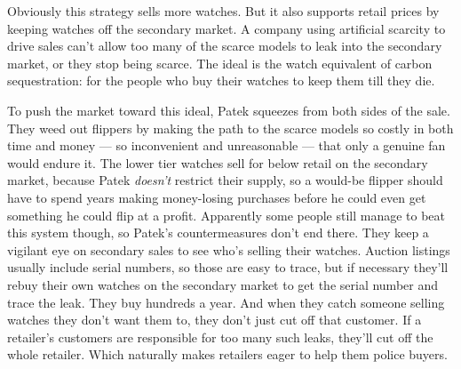 \documentclass[12pt]{book}
\begin{document}
Obviously this strategy sells more watches. But it also supports retail
prices by keeping watches off the secondary market. A company using
artificial scarcity to drive sales can't allow too many of the scarce
models to leak into the secondary market, or they stop being scarce. The
ideal is the watch equivalent of carbon sequestration: for the people
who buy their watches to keep them till they die.

To push the market toward this ideal, Patek squeezes from both sides of
the sale. They weed out flippers by making the path to the scarce models
so costly in both time and money --- so inconvenient and unreasonable
--- that only a genuine fan would endure it. The lower tier watches sell
for below retail on the secondary market, because Patek \emph{doesn't}
restrict their supply, so a would-be flipper should have to spend years
making money-losing purchases before he could even get something he
could flip at a profit. Apparently some people still manage to beat this
system though, so Patek's countermeasures don't end there. They keep a
vigilant eye on secondary sales to see who's selling their watches.
Auction listings usually include serial numbers, so those are easy to
trace, but if necessary they'll rebuy their own watches on the secondary
market to get the serial number and trace the leak. They buy hundreds a
year. And when they catch someone selling watches they don't want them
to, they don't just cut off that customer. If a retailer's customers are
responsible for too many such leaks, they'll cut off the whole retailer.
Which naturally makes retailers eager to help them police buyers.
\end{document}
